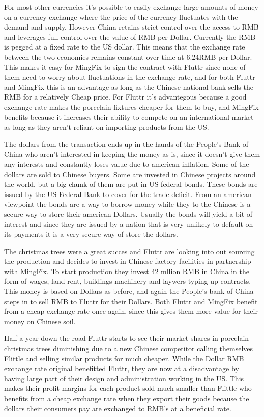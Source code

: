 \documentclass[11pt]{article}
\begin{document}
For most other currencies it's possible to easily exchange large amounts 
of money on a currency exchange where the price of the currency 
fluctuates with the demand and supply. However China retains strict 
control over the access to RMB and leverages full control over the value 
of RMB per Dollar. Currently the RMB is pegged at a fixed rate to the US 
dollar.  This means that the exchange rate between the two economies 
remains constant over time at 6.24RMB per Dollar. This makes it easy for 
MingFix to sign the contract with Fluttr since none of them need to 
worry about fluctuations in the exchange rate, and for both Fluttr and 
MingFix this is an advantage as long as the Chinese national bank sells 
the RMB for a relatively Cheap price. For Fluttr it's advantegous 
because a good exchange rate makes the porcelain fixtures cheaper for 
them to buy, and MingFix benefits because it increases their ability to 
compete on an international market as long as they aren't reliant on 
importing products from the US.

The dollars from the transaction ends up in the hands of the People's 
Bank of China who aren't interested in keeping the money as is, since it 
doesn't give them any interests and constantly loses value due to 
american inflation. Some of the dollars are sold to Chinese buyers. Some 
are invested in Chinese projects around the world, but a big chunk of 
them are put in US federal bonds. These bonds are issued by the US 
Federal Bank to cover for the trade deficit. From an american viewpoint 
the bonds are a way to borrow money while they to the Chinese is a 
secure way to store their american Dollars. Usually the bonds will yield 
a bit of interest and since they are issued by a nation that is very 
unlikely to default on its payments it is a very secure way of store the 
dollars.

The christmas trees were a great succes and Fluttr are looking into out 
sourcing the production and decides to invest in Chinese factory 
facilities in partnership with MingFix. To start production they invest 
42 mllion RMB in China in the form of wages, land rent, buildings 
machinery and laywers typing up contracts.  This money is based on 
Dollars as before, and again the People's bank of China steps in to sell 
RMB to Fluttr for their Dollars.  Both Fluttr and MingFix benefit from a 
cheap exchange rate once again, since this gives them more value for 
their money on Chinese soil.

Half a year down the road Fluttr starts to see their market shares in 
porcelain christmas trees diminishing due to a new Chinese competitor 
calling themselves Flittle and selling similar products for much 
cheaper.  While the Dollar RMB exchange rate original benefitted Fluttr, 
they are now at a disadvantage by having large part of their design and 
administration working in the US. This makes their profit margins for 
each product sold much smaller than Flittle who benefits from a cheap 
exchange rate when they export their goods because the dollars their 
consumers pay are exchanged to RMB's at a beneficial rate.
\end{document}
